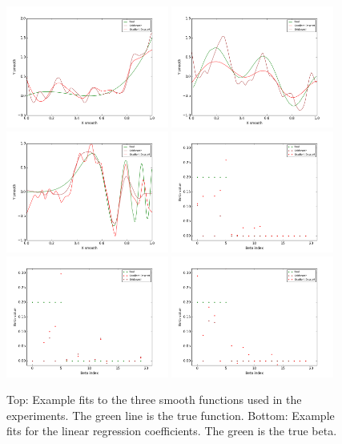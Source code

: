 \documentclass[10pt,letterpaper]{article}
\begin{document}
\begin{figure}
\includegraphics[height=40mm]{smooth_linear_thetas_2_100_20_6.png}
\includegraphics[height=40mm]{smooth_linear_thetas_0_100_20_6.png}
\includegraphics[height=40mm]{smooth_linear_thetas_1_100_20_6.png}
\includegraphics[height=40mm]{smooth_linear_beta_2_100_20_6.png}
\includegraphics[height=40mm]{smooth_linear_beta_0_100_20_6.png}
\includegraphics[height=40mm]{smooth_linear_beta_1_100_20_6.png}
\caption{Top: Example fits to the three smooth functions used in the experiments. The green line is the true function. Bottom: Example fits for the linear regression coefficients. The green is the true beta.}
\label{fig:modelfits}
\end{figure}
\end{document}
